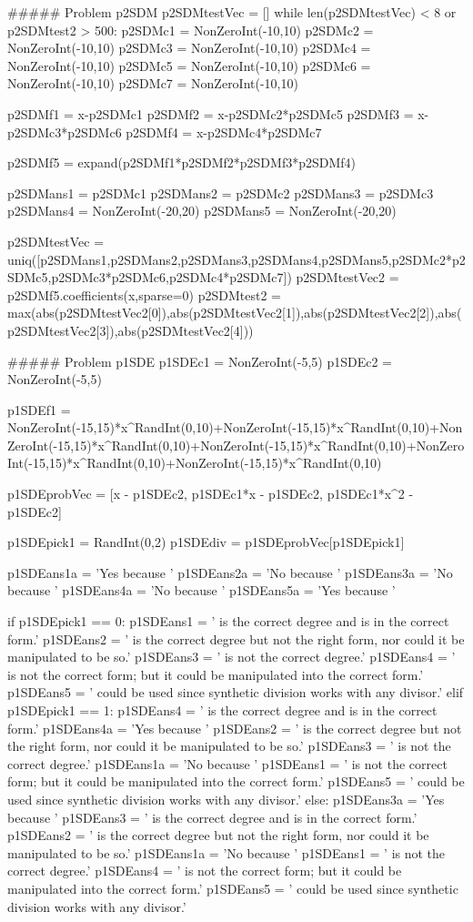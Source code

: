 \documentclass{ximera}
\begin{document}
\begin{sagesilent}
##### Problem p2SDM
p2SDMtestVec = []
while len(p2SDMtestVec) < 8 or p2SDMtest2 > 500:
    p2SDMc1 = NonZeroInt(-10,10)
    p2SDMc2 = NonZeroInt(-10,10)
    p2SDMc3 = NonZeroInt(-10,10)
    p2SDMc4 = NonZeroInt(-10,10)
    p2SDMc5 = NonZeroInt(-10,10)
    p2SDMc6 = NonZeroInt(-10,10)
    p2SDMc7 = NonZeroInt(-10,10)
    
    p2SDMf1 = x-p2SDMc1
    p2SDMf2 = x-p2SDMc2*p2SDMc5
    p2SDMf3 = x-p2SDMc3*p2SDMc6
    p2SDMf4 = x-p2SDMc4*p2SDMc7
    
    p2SDMf5 = expand(p2SDMf1*p2SDMf2*p2SDMf3*p2SDMf4)
    
    p2SDMans1 = p2SDMc1
    p2SDMans2 = p2SDMc2
    p2SDMans3 = p2SDMc3
    p2SDMans4 = NonZeroInt(-20,20)
    p2SDMans5 = NonZeroInt(-20,20)
    
    p2SDMtestVec = uniq([p2SDMans1,p2SDMans2,p2SDMans3,p2SDMans4,p2SDMans5,p2SDMc2*p2SDMc5,p2SDMc3*p2SDMc6,p2SDMc4*p2SDMc7])
    p2SDMtestVec2 = p2SDMf5.coefficients(x,sparse=0)
    p2SDMtest2 = max(abs(p2SDMtestVec2[0]),abs(p2SDMtestVec2[1]),abs(p2SDMtestVec2[2]),abs(p2SDMtestVec2[3]),abs(p2SDMtestVec2[4]))


##### Problem p1SDE
p1SDEc1 = NonZeroInt(-5,5)
p1SDEc2 = NonZeroInt(-5,5)

p1SDEf1 = NonZeroInt(-15,15)*x^RandInt(0,10)+NonZeroInt(-15,15)*x^RandInt(0,10)+NonZeroInt(-15,15)*x^RandInt(0,10)+NonZeroInt(-15,15)*x^RandInt(0,10)+NonZeroInt(-15,15)*x^RandInt(0,10)+NonZeroInt(-15,15)*x^RandInt(0,10)

p1SDEprobVec = [x - p1SDEc2, p1SDEc1*x - p1SDEc2, p1SDEc1*x^2 - p1SDEc2]

p1SDEpick1 = RandInt(0,2)
p1SDEdiv = p1SDEprobVec[p1SDEpick1]

p1SDEans1a = 'Yes because '
p1SDEans2a = 'No because '
p1SDEans3a = 'No because '
p1SDEans4a = 'No because '
p1SDEans5a = 'Yes because '


if p1SDEpick1 == 0:
    p1SDEans1 = ' is the correct degree and is in the correct form.'
    p1SDEans2 = ' is the correct degree but not the right form, nor could it be manipulated to be so.'
    p1SDEans3 = ' is not the correct degree.'
    p1SDEans4 = ' is not the correct form; but it could be manipulated into the correct form.'
    p1SDEans5 = ' could be used since synthetic division works with any divisor.'
elif p1SDEpick1 == 1:
    p1SDEans4 = ' is the correct degree and is in the correct form.'
    p1SDEans4a = 'Yes because '
    p1SDEans2 = ' is the correct degree but not the right form, nor could it be manipulated to be so.'
    p1SDEans3 = ' is not the correct degree.'
    p1SDEans1a = 'No because '
    p1SDEans1 = ' is not the correct form; but it could be manipulated into the correct form.'
    p1SDEans5 = ' could be used since synthetic division works with any divisor.'
else:
    p1SDEans3a = 'Yes because '
    p1SDEans3 = ' is the correct degree and is in the correct form.'
    p1SDEans2 = ' is the correct degree but not the right form, nor could it be manipulated to be so.'
    p1SDEans1a = 'No because '
    p1SDEans1 = ' is not the correct degree.'
    p1SDEans4 = ' is not the correct form; but it could be manipulated into the correct form.'
    p1SDEans5 = ' could be used since synthetic division works with any divisor.'


\end{sagesilent}
\end{document}
